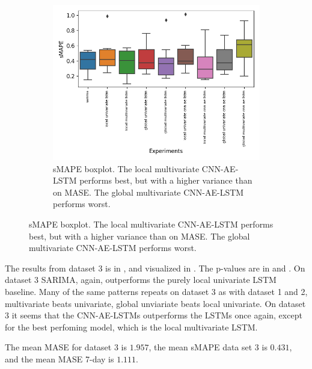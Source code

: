 \begin{samepage}
\begin{figure}[h!]
\begin{subfigure}[t]{0.49\textwidth}
    \end{subfigure}
    \begin{subfigure}[t]{0.49\textwidth}
      \includegraphics[width=\textwidth]{./figs/results/boxplot/smape-dataset_3.png}
      \hfill
      \caption{sMAPE boxplot. The local multivariate CNN-AE-LSTM performs best,
        but with a higher variance than on MASE.
        The global multivariate CNN-AE-LSTM performs worst.}
      \label{fig:results:boxplot-smape-dataset-3}
    \end{subfigure}
    \label{fig:results:boxplot-dataset-3}
  \end{figure}
\end{samepage}
The results from dataset 3 is in ,
and visualized in .
The p-values are in  and
.
On dataset 3 SARIMA, again, outperforms the purely local univariate LSTM baseline.
Many of the same patterns repeats on dataset 3 as with dataset 1 and 2, multivariate beats univariate,
global unviariate beats local univariate.
On dataset 3 it seems that the CNN-AE-LSTMs outperforms the LSTMs once again, except for the
best perfoming model, which is the local multivariate LSTM.


The mean MASE for dataset 3 is $1.957$,
the mean sMAPE data set 3 is $0.431$,
and the mean MASE 7-day is $1.111$.




